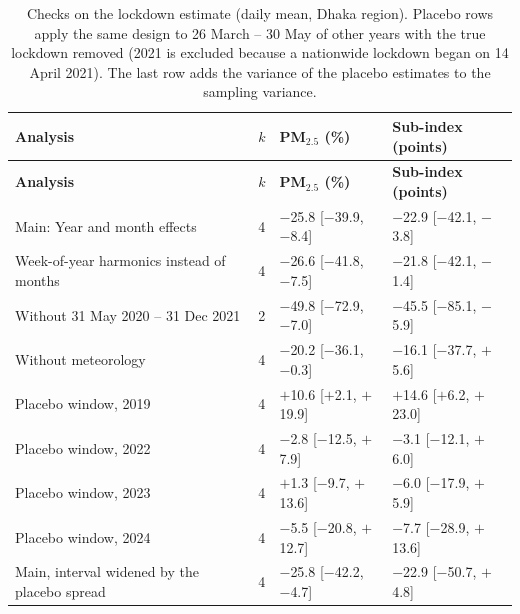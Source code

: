 \begingroup\footnotesize
\begin{longtable}{L{6.4cm} C{0.7cm} C{3.0cm} C{3.0cm}}
\caption{Checks on the lockdown estimate (daily mean, Dhaka region). Placebo rows apply the same design to 26 March -- 30 May of other years with the true lockdown removed (2021 is excluded because a nationwide lockdown began on 14 April 2021). The last row adds the variance of the placebo estimates to the sampling variance.}\label{tab:s-lockdown-checks}\\
\toprule
\textbf{Analysis} & \textbf{$k$} & \textbf{PM$_{2.5}$ (\%)} & \textbf{Sub-index (points)} \\
\midrule\endfirsthead
\toprule
\textbf{Analysis} & \textbf{$k$} & \textbf{PM$_{2.5}$ (\%)} & \textbf{Sub-index (points)} \\
\midrule\endhead
\bottomrule\endfoot
Main: Year and month effects & 4 & $-$25.8 {\scriptsize[$-$39.9, $-$8.4]} & $-$22.9 {\scriptsize[$-$42.1, $-$3.8]} \\
Week-of-year harmonics instead of months & 4 & $-$26.6 {\scriptsize[$-$41.8, $-$7.5]} & $-$21.8 {\scriptsize[$-$42.1, $-$1.4]} \\
Without 31 May 2020 -- 31 Dec 2021 & 2 & $-$49.8 {\scriptsize[$-$72.9, $-$7.0]} & $-$45.5 {\scriptsize[$-$85.1, $-$5.9]} \\
Without meteorology & 4 & $-$20.2 {\scriptsize[$-$36.1, $-$0.3]} & $-$16.1 {\scriptsize[$-$37.7, $+$5.6]} \\
Placebo window, 2019 & 4 & $+$10.6 {\scriptsize[$+$2.1, $+$19.9]} & $+$14.6 {\scriptsize[$+$6.2, $+$23.0]} \\
Placebo window, 2022 & 4 & $-$2.8 {\scriptsize[$-$12.5, $+$7.9]} & $-$3.1 {\scriptsize[$-$12.1, $+$6.0]} \\
Placebo window, 2023 & 4 & $+$1.3 {\scriptsize[$-$9.7, $+$13.6]} & $-$6.0 {\scriptsize[$-$17.9, $+$5.9]} \\
Placebo window, 2024 & 4 & $-$5.5 {\scriptsize[$-$20.8, $+$12.7]} & $-$7.7 {\scriptsize[$-$28.9, $+$13.6]} \\
Main, interval widened by the placebo spread & 4 & $-$25.8 {\scriptsize[$-$42.2, $-$4.7]} & $-$22.9 {\scriptsize[$-$50.7, $+$4.8]} \\
\end{longtable}
\endgroup

